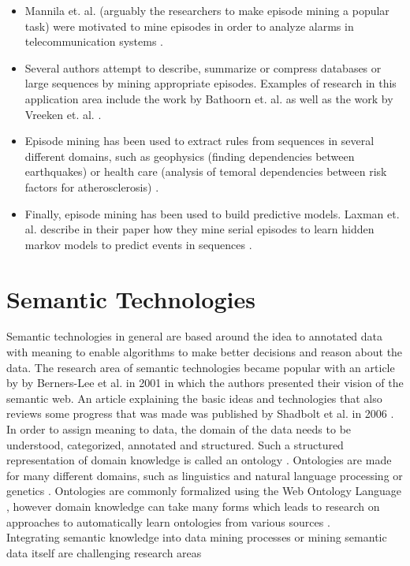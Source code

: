 \begin{itemize}
	\item Mannila et. al. (arguably the researchers to make episode mining a popular task) were motivated to mine episodes in order to analyze alarms in telecommunication systems \cite{mannila1997discovery}.
	\item Several authors attempt to describe, summarize or compress databases or large sequences by mining appropriate episodes. Examples of research in this application area include the work by Bathoorn et. al. \cite{bathoorn2007finding} as well as the work by Vreeken et. al. \cite{vreeken2012summarising}.
	\item Episode mining has been used to extract rules from sequences in several different domains, such as geophysics (finding dependencies between earthquakes) \cite{meger2004constraint} or health care (analysis of temoral dependencies between risk factors for atherosclerosis) \cite{meger2004mining}.
	\item Finally, episode mining has been used to build predictive models. Laxman et. al. describe in their paper how they mine serial episodes to learn hidden markov models to predict events in sequences \cite{laxman2008stream}. 
\end{itemize}

\section{Semantic Technologies}
\label{subsec_semanticWeb}
Semantic technologies in general are based around the idea to annotated data with meaning to enable algorithms to make better decisions and reason about the data. The research area of semantic technologies became popular with an article by by Berners-Lee et al. in 2001 \cite{berners2001semantic} in which the authors presented their vision of the semantic web. An article explaining the basic ideas and technologies that also reviews some progress that was made was published by Shadbolt et al. in 2006 \cite{shadbolt2006semantic}. In order to assign meaning to data, the domain of the data needs to be understood, categorized, annotated and structured. Such a structured representation of domain knowledge is called an ontology \cite{noy2004semantic}. Ontologies are made for many different domains, such as linguistics and natural language processing \cite{dahlgren1995linguistic} or genetics \cite{botstein2000gene}. Ontologies are commonly formalized using the Web Ontology Language \cite{bechhofer2009owl}, however domain knowledge can take many forms which leads to research on approaches to automatically learn ontologies from various sources \cite{maedche2012ontology}. \\
Integrating semantic knowledge into data mining processes \cite{mabroukeh2009using} or mining semantic data itself \cite{stumme2006semantic} are challenging research areas


